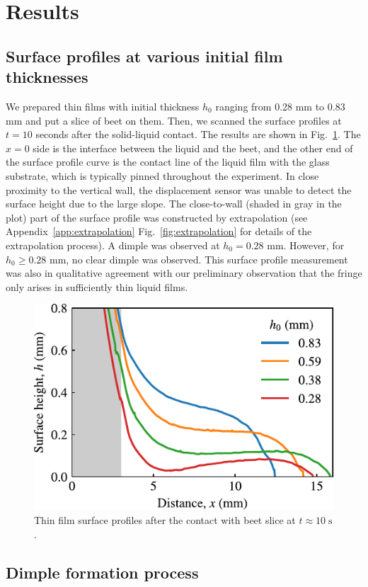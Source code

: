 \documentclass[aps,prfluids,amsmath,amssymb,superscriptaddress,longbibliography]{revtex4-2}
\begin{document}
\section{Results}

\subsection{Surface profiles at various initial film thicknesses}

We prepared thin films with initial thickness $h_0$ ranging from 0.28 mm to 0.83 mm and put a slice of beet on them. 
Then, we scanned the surface profiles at $t=10$ seconds after the solid-liquid contact.
The results are shown in Fig.~\ref{fig:various-initial-thickness}.
The $x=0$ side is the interface between the liquid and the beet, and the other end of the surface profile curve is the contact line of the liquid film with the glass substrate, which is typically pinned throughout the experiment.
In close proximity to the vertical wall, the displacement sensor was unable to detect the surface height due to the large slope.
The close-to-wall (shaded in gray in the plot) part of the surface profile was constructed by extrapolation (see Appendix~\ref{app:extrapolation} Fig.~\ref{fig:extrapolation} for details of the extrapolation process).
A dimple was observed at $h_0 = 0.28$ mm.
However, for $h_0 \ge 0.28$ mm, no clear dimple was observed.
This surface profile measurement was also in qualitative agreement with our preliminary observation that the fringe only arises in sufficiently thin liquid films.

\begin{figure}
    \centering
    \includegraphics[width=.5\linewidth]{various_initial_thickness.pdf}
    \caption{
    Thin film surface profiles after the contact with beet slice at $t\approx 10\;\mathrm{s}$.
    }
    \label{fig:various-initial-thickness}
\end{figure}

\subsection{Dimple formation process}
\end{document}
